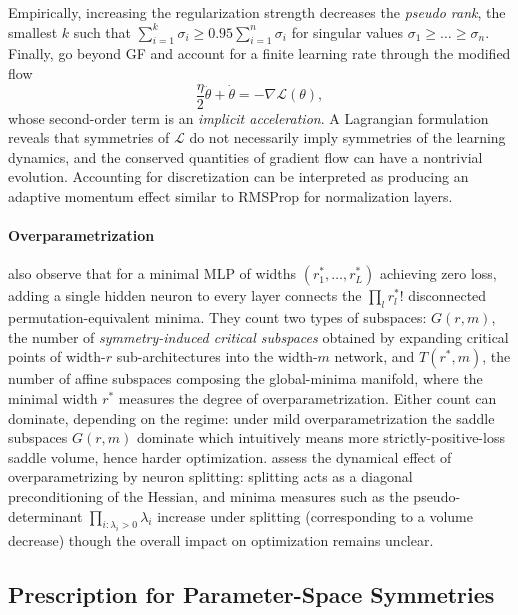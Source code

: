 \documentclass[mathematics,review,submit,moreauthors]{Definitions/mdpi}
\begin{document}
Empirically, increasing the regularization strength decreases the \emph{pseudo rank}, the smallest $k$ such that $\sum_{i=1}^{k}\sigma_i \ge 0.95 \sum_{i=1}^{n}\sigma_i$ for singular values $\sigma_1\ge\dots\ge\sigma_n$.
Finally, \citet{tanaka2021} go beyond GF and account for a finite learning rate through the modified flow
\begin{equation*}
    \frac{\eta}{2}\ddot\theta+\dot\theta=-\nabla\mathcal{L}(\theta),
\end{equation*}
whose second-order term is an \emph{implicit acceleration}.
A Lagrangian formulation reveals that symmetries of $\mathcal{L}$ do not necessarily imply symmetries of the learning dynamics, and the conserved quantities of gradient flow can have a nontrivial evolution.
Accounting for discretization can be interpreted as producing an adaptive momentum effect similar to RMSProp for normalization layers.

\paragraph{Overparametrization}
\citet{simsek2021} also observe \citep{brea2019} that for a minimal MLP of widths $(r_1^{*},\dots,r_L^{*})$ achieving zero loss, adding a single hidden neuron to every layer connects the $\prod_l r_l^{*}!$ disconnected permutation-equivalent minima.
They count two types of subspaces: $G(r,m)$, the number of \emph{symmetry-induced critical subspaces} obtained by expanding critical points of width-$r$ sub-architectures into the width-$m$ network, and $T(r^{*},m)$, the number of affine subspaces composing the global-minima manifold, where the minimal width $r^{*}$ measures the degree of overparametrization.
Either count can dominate, depending on the regime: under mild overparametrization the saddle subspaces $G(r,m)$ dominate which intuitively means more strictly-positive-loss saddle volume, hence harder optimization.
\citet{sareen2026} assess the dynamical effect of overparametrizing by neuron splitting: splitting acts as a diagonal preconditioning of the Hessian, and minima measures such as the pseudo-determinant $\prod_{i:\lambda_i>0}\lambda_i$ increase under splitting (corresponding to a volume decrease) though the overall impact on optimization remains unclear.

\subsection{Prescription for Parameter-Space Symmetries}\label{sec:bug-or-feature}
\end{document}
